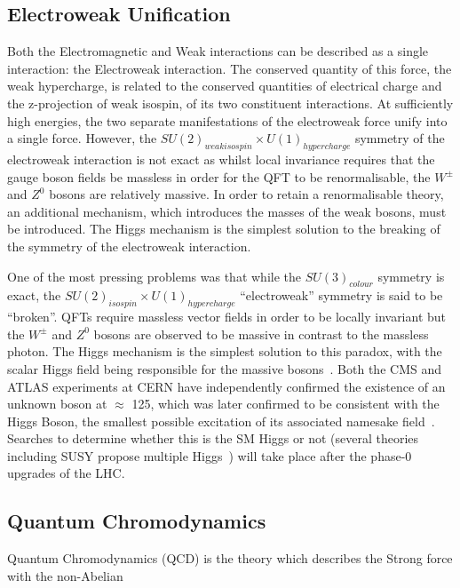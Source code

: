 \subsection{Electroweak Unification}\label{subsec:electroweak}
Both the Electromagnetic and Weak interactions can be described as a single interaction: the Electroweak interaction. 
The conserved quantity of this force, the weak hypercharge, is related to the conserved quantities of electrical charge and the z-projection of weak isospin, of its two constituent interactions. 
At sufficiently high energies, the two separate manifestations of the electroweak force unify into a single force. 
However, the $SU(2)_{weak isospin} \times U(1)_{hypercharge}$ symmetry of the electroweak interaction is not exact as whilst local invariance requires that the gauge boson fields be massless in order for the QFT to be renormalisable, the $W^{\pm}$ and $Z^{0}$ bosons are relatively massive. 
In order to retain a renormalisable theory, an additional mechanism, which introduces the masses of the weak bosons, must be introduced. 
The Higgs mechanism is the simplest solution to the breaking of the symmetry of the electroweak interaction\cite{LagrangiansSM}. 

One of the most pressing problems was that while the $SU(3)_{colour}$ symmetry is exact, the $SU(2)_{isospin} \times U(1)_{hypercharge}$ ``electroweak'' symmetry is said to be ``broken''. 
QFTs require massless vector fields in order to be locally invariant but the $W^{\pm}$ and $Z^{0}$ bosons are observed to be massive in contrast to the massless photon. 
The Higgs mechanism is the simplest solution to this paradox, with the scalar Higgs field being responsible for the massive bosons~\cite{oldcms}. 
Both the CMS and ATLAS experiments at CERN have independently confirmed the existence of an unknown boson at $\approx$ 125\GeV, which was later confirmed to be consistent with the Higgs Boson, the smallest possible excitation of its associated namesake field~\cite{HiggsCMS,HiggsATLAS}. 
Searches to determine whether this is the SM Higgs or not (several theories including SUSY propose multiple Higgs~\cite{Khalil:2003vd,Gianotti:2002xx}) will take place after the phase-0 upgrades of the LHC. 


\subsection{Quantum Chromodynamics}\label{subsec:QED}
Quantum Chromodynamics (QCD) is the theory which describes the Strong force with the non-Abelian 

